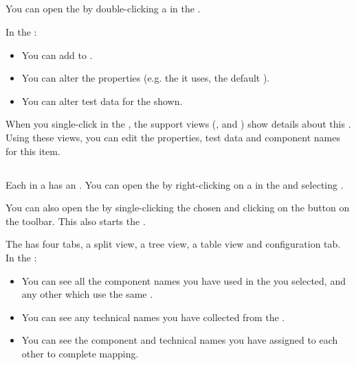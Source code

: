 \subsection{\gdtestsuiteeditor}

You can open the \gdtestsuiteeditor{} by double-clicking a \gdsuite{} in the \gdtestsuitebrowser{}.


In the \gdtestsuiteeditor{}:
\begin{itemize}
\item You can add \gdcases{} to \gdsuites{}. 
\item You can alter the \gdsuite{} properties (e.g. the \gdaut{} it uses, the default \gdehandlers{}).
\item You can alter test data for the \gdcases{} shown. 
 \end{itemize}
 


 When you single-click \gdcases{} in the \gdtestsuiteeditor{}, the support views (\gdpropview{}, \gdcompnamesview{} and \gddatasetsview{}) show details about this \gdcase{}. Using these views, you can edit the properties, test data and component names for this item. 

\subsection{\gdomeditor}

Each \gdaut{} in a \gdproject{} has an \gdomeditor{}. You can open the  \gdomeditor{} by right-clicking on a \gdsuite{} in the \gdtestsuitebrowser{} and selecting . 

You can also open the \gdomeditor{} by single-clicking the chosen \gdsuite{} and clicking on the  button on the toolbar. This also starts the \gdomm{}. 

The \gdomeditor{} has four tabs, a split view, a tree view, a table view and configuration tab. 
In the \gdomeditor{}:
\begin{itemize}
\item You can see all the component names you have used in the \gdsuite{} you selected, and any other \gdsuites{} which use the same \gdaut{}. 
\item You can see any technical names you have collected from the \gdaut{}. 
\item You can see the component and technical names you have assigned to each other to complete mapping. 
\end{itemize}

